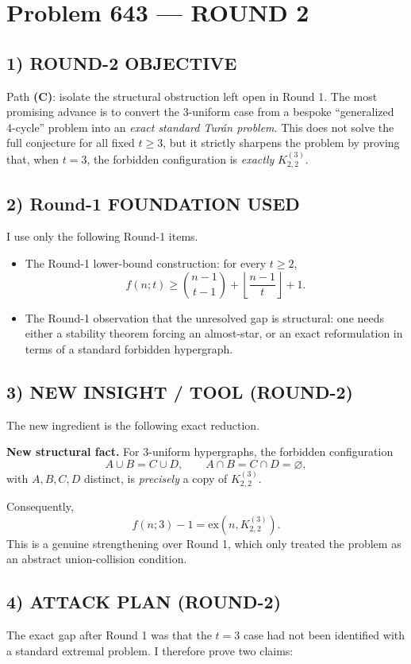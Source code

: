 \section{Problem 643 --- ROUND 2}

\subsection*{1) ROUND-2 OBJECTIVE}
Path \textbf{(C)}: isolate the structural obstruction left open in Round 1.  The most promising advance is to convert the 3-uniform case from a bespoke ``generalized 4-cycle'' problem into an \emph{exact standard Tur\'an problem}.  This does not solve the full conjecture for all fixed $t\ge 3$, but it strictly sharpens the problem by proving that, when $t=3$, the forbidden configuration is \emph{exactly} $K^{(3)}_{2,2}$.

\subsection*{2) Round-1 FOUNDATION USED}
I use only the following Round-1 items.

\begin{itemize}
\item The Round-1 lower-bound construction: for every $t\ge 2$,
\[
 f(n;t)\ge \binom{n-1}{t-1}+\left\lfloor \frac{n-1}{t}\right\rfloor+1.
\]
\item The Round-1 observation that the unresolved gap is structural: one needs either a stability theorem forcing an almost-star, or an exact reformulation in terms of a standard forbidden hypergraph.
\end{itemize}

\subsection*{3) NEW INSIGHT / TOOL (ROUND-2)}
The new ingredient is the following exact reduction.

\medskip
\noindent
\textbf{New structural fact.}
For $3$-uniform hypergraphs, the forbidden configuration
\[
A\cup B=C\cup D,
\qquad
A\cap B=C\cap D=\varnothing,
\]
with $A,B,C,D$ distinct, is \emph{precisely} a copy of $K^{(3)}_{2,2}$.

Consequently,
\[
 f(n;3)-1 = \mathrm{ex}(n,K^{(3)}_{2,2}).
\]
This is a genuine strengthening over Round 1, which only treated the problem as an abstract union-collision condition.

\subsection*{4) ATTACK PLAN (ROUND-2)}
The exact gap after Round 1 was that the $t=3$ case had not been identified with a standard extremal problem.  I therefore prove two claims:

